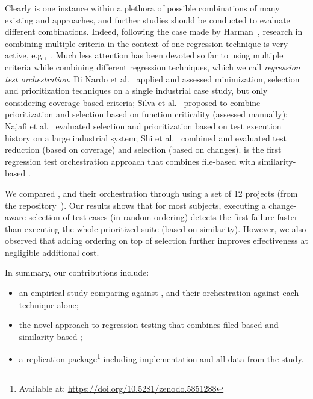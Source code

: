 Clearly \fz is one instance within a plethora of possible combinations of many existing \tcs and \tcp approaches, and further studies should be conducted to evaluate  different combinations.
Indeed, following the case made by Harman~\cite{harman2011making},
research in combining multiple criteria in the context of one regression technique is very active, e.g.,~\cite{epitropakis2015empirical,garousi2018multi}.
Much less attention has been devoted so far to using multiple criteria while combining different regression techniques, which we call \textit{regression test orchestration}.
Di Nardo et al.~\cite{di2015coverage} applied and assessed minimization, selection and prioritization techniques on a single industrial case study, but only considering coverage-based criteria;  Silva et al.~\cite{silva2016hybrid} proposed to combine prioritization and selection based on function criticality (assessed manually); Najafi et al.~\cite{najafi2019improving} evaluated selection and prioritization based on test execution history on a large industrial system;
Shi et al.~\cite{shi2015comparing} combined and evaluated test reduction (based on coverage) and selection (based on changes). 
\fz is the first regression test orchestration approach that combines file-based \tcs with similarity-based \tcp.

We compared \ek, \fs and their orchestration through \fz using a set of 12 projects (from the \dfj repository~\cite{just2014defects4j}).
Our results shows that for most subjects, executing a change-aware selection of test cases (in random ordering) detects the first failure faster than executing the whole prioritized suite (based on similarity). However, we also observed that adding \fs ordering on top of \ek selection further improves effectiveness at negligible additional cost.


\noindent
In summary, our contributions include:
\begin{itemize}
\item an empirical study comparing \tcs against \tcp, and their orchestration against each technique alone;
\item the novel \fz approach to regression testing that combines filed-based \tcs and similarity-based \tcp;
\item a replication package\footnote{Available at: \url{https://doi.org/10.5281/zenodo.5851288}} including \fz implementation and all data from the study.
\end{itemize}

